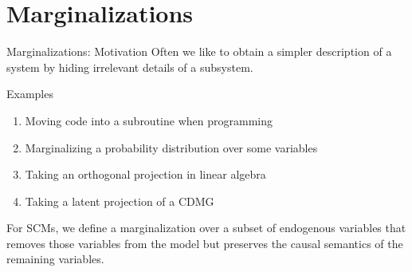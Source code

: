 \part{Marginalizations}
\frame{\partpage}

\begin{frame}{Marginalizations: Motivation}
  Often we like to obtain a simpler description of a system by hiding irrelevant details of a subsystem.

  \begin{block}{Examples}
    \begin{enumerate}
      \item Moving code into a subroutine when programming
      \item Marginalizing a probability distribution over some variables
      \item Taking an orthogonal projection in linear algebra
      \item Taking a latent projection of a CDMG
    \end{enumerate}
  \end{block}

  For SCMs, we define a marginalization over a subset of endogenous variables that removes those
  variables from the model but preserves the causal semantics of the remaining variables.
\end{frame}

